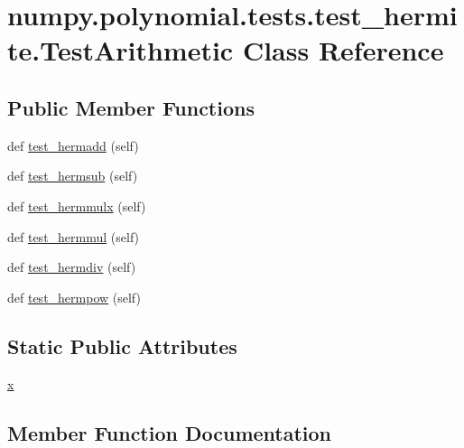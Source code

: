 \hypertarget{classnumpy_1_1polynomial_1_1tests_1_1test__hermite_1_1TestArithmetic}{}\section{numpy.\+polynomial.\+tests.\+test\+\_\+hermite.\+Test\+Arithmetic Class Reference}
\label{classnumpy_1_1polynomial_1_1tests_1_1test__hermite_1_1TestArithmetic}
\subsection*{Public Member Functions}
\begin{DoxyCompactItemize}
\item 
def \hyperlink{classnumpy_1_1polynomial_1_1tests_1_1test__hermite_1_1TestArithmetic_aa56b367100dd2668825a34f20de24934}{test\+\_\+hermadd} (self)
\item 
def \hyperlink{classnumpy_1_1polynomial_1_1tests_1_1test__hermite_1_1TestArithmetic_a28d2c0bd07a9efbdab7b9bc3b37c39f5}{test\+\_\+hermsub} (self)
\item 
def \hyperlink{classnumpy_1_1polynomial_1_1tests_1_1test__hermite_1_1TestArithmetic_ac9abcf24f5f226bf9c8a3b844a114671}{test\+\_\+hermmulx} (self)
\item 
def \hyperlink{classnumpy_1_1polynomial_1_1tests_1_1test__hermite_1_1TestArithmetic_a63fcd83dce760a2c97347e1d2fdd2cfb}{test\+\_\+hermmul} (self)
\item 
def \hyperlink{classnumpy_1_1polynomial_1_1tests_1_1test__hermite_1_1TestArithmetic_a6f48433886651807807bdcc22375aa7d}{test\+\_\+hermdiv} (self)
\item 
def \hyperlink{classnumpy_1_1polynomial_1_1tests_1_1test__hermite_1_1TestArithmetic_af73b129220d49ebc3e5bf26335697099}{test\+\_\+hermpow} (self)
\end{DoxyCompactItemize}
\subsection*{Static Public Attributes}
\begin{DoxyCompactItemize}
\item 
\hyperlink{classnumpy_1_1polynomial_1_1tests_1_1test__hermite_1_1TestArithmetic_ae952dc28d8b7d96d41b9f59badb40382}{x}
\end{DoxyCompactItemize}


\subsection{Member Function Documentation}
\mbox{\label{classnumpy_1_1polynomial_1_1tests_1_1test__hermite_1_1TestArithmetic_aa56b367100dd2668825a34f20de24934}} 

